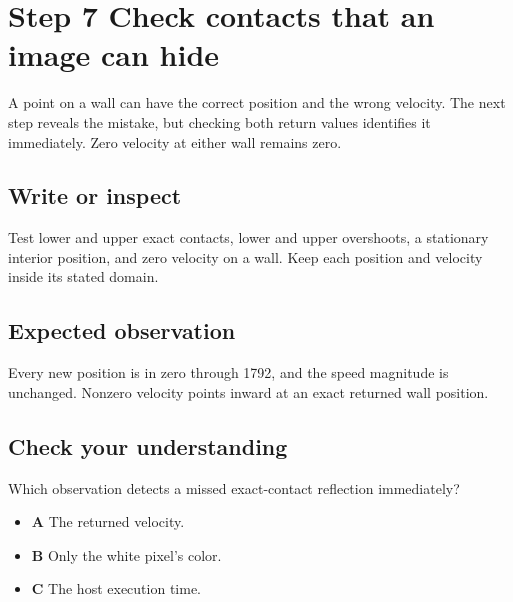 \section{Step 7 Check contacts that an image can hide}\label{ball-s07}

A point on a wall can have the correct position and the wrong velocity. The next step reveals the mistake, but checking both return values identifies it immediately. Zero velocity at either wall remains zero.

\subsection{Write or inspect}
Test lower and upper exact contacts, lower and upper overshoots, a stationary interior position, and zero velocity on a wall. Keep each position and velocity inside its stated domain.

\subsection{Expected observation}
Every new position is in zero through 1792, and the speed magnitude is unchanged. Nonzero velocity points inward at an exact returned wall position.

\subsection{Check your understanding}
Which observation detects a missed exact-contact reflection immediately?

\begin{itemize}
  \item \textbf{A} The returned velocity.
  \item \textbf{B} Only the white pixel’s color.
  \item \textbf{C} The host execution time.
\end{itemize}
